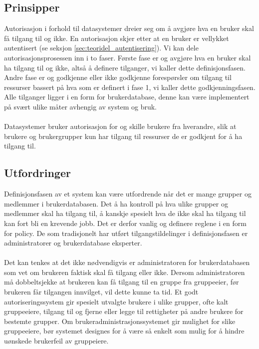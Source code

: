 \subsection*{Prinsipper}
Autorisasjon i forhold til datasystemer dreier seg om å avgjøre hva en bruker skal få tilgang til og ikke. En autorisasjon skjer etter at en bruker er vellykket autentisert (se seksjon \ref{sec:teoridel_autentisering}). Vi kan dele autorisasjonsprosessen inn i to faser. Første fase er og avgjøre hva en bruker skal ha tilgang til og ikke, altså å definere tilganger, vi kaller dette definisjonsfasen. Andre fase er og godkjenne eller ikke godkjenne forespørsler om tilgang til ressurser bassert på hva som er definert i fase 1, vi kaller dette godkjenningsfasen. Alle tilganger ligger i en form for brukerdatabase, denne kan være implementert på svært ulike måter avhengig av system og bruk. \\
\\
Datasystemer bruker autorisasjon for og skille brukere fra hverandre, slik at brukere og brukergrupper kun har tilgang til ressurser de er godkjent for å ha tilgang til.

\subsection*{Utfordringer}
Definisjonsfasen av et system kan være utfordrende når det er mange grupper og medlemmer i brukerdatabasen.  Det å ha kontroll på hva ulike grupper og medlemmer skal ha tilgang til, å kanskje spesielt hva de ikke skal ha tilgang til kan fort bli en krevende jobb. Det er derfor vanlig og definere reglene i en form for policy. De som tradisjonelt har utført tilgangstildelinger i definisjonsfasen er administratorer og brukerdatabase eksperter.  \\
\\
Det kan tenkes at det ikke nødvendigvis er administratoren for brukerdatabasen som vet om brukeren faktisk skal få tilgang eller ikke. Dersom administratoren må dobbeltsjekke at brukeren kan få tilgang til en gruppe fra gruppeeier, før brukeren får tilgangen innvilget, vil dette kunne ta tid. Et godt autoriseringssystem gir spesielt utvalgte brukere i ulike grupper, ofte kalt gruppeeiere, tilgang til og fjerne eller legge til rettigheter på andre brukere for bestemte grupper. Om brukeradministrasjonssystemet gir mulighet for slike gruppeeiere, bør systemet designes for å være så enkelt som mulig for å hindre uønskede brukerfeil av gruppeiere.

